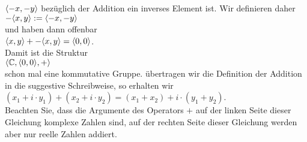 $\pair(-x,-y)$ bez\"{u}glich der Addition ein inverses Element ist.  Wir definieren daher
\\[0.2cm]
\hspace*{1.3cm}
$-\pair(x,y) := \pair(-x,-y)$
\\[0.2cm]
und haben dann offenbar
\\[0.2cm]
\hspace*{1.3cm}
$\pair(x, y) + -\pair(x,y) = \pair(0,0)$.
\\[0.2cm]
Damit ist die Struktur
\\[0.2cm]
\hspace*{1.3cm}
$\langle \mathbb{C}, \pair(0,0), + \rangle$
\\[0.2cm]
schon mal eine kommutative Gruppe.
\"{u}bertragen wir die Definition der Addition in die suggestive Schreibweise, so erhalten wir
\\[0.2cm]
\hspace*{1.3cm}
$(x_1 + i \cdot y_1) + (x_2 + i \cdot y_2) = (x_1 + x_2) + i \cdot (y_1 + y_2)$.
\\[0.2cm]
Beachten Sie, dass die Argumente des Operators $+$ auf der linken Seite dieser Gleichung
komplexe Zahlen sind, auf der rechten Seite dieser Gleichung werden aber nur reelle Zahlen
addiert.  

